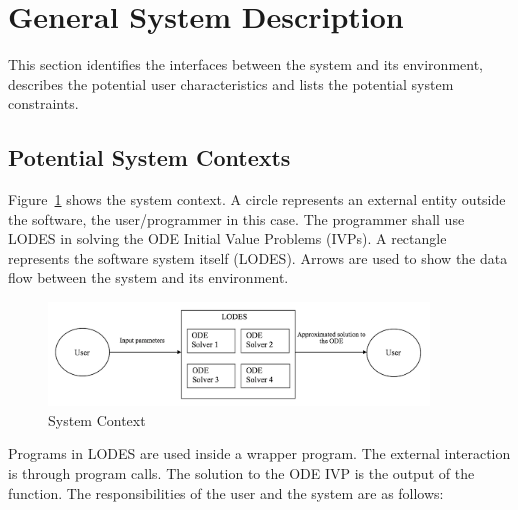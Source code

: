 \documentclass[12pt]{article}
\newcommand{\famname}{LODES} %
\begin{document}
\section{General System Description}

This section identifies the interfaces between the system and its environment,
describes the potential user characteristics and lists the potential system
constraints.

\subsection{Potential System Contexts}

Figure~\ref{Fig_SystemContext} shows the system context.  A circle represents an
external entity outside the software, the user/programmer in this case. The programmer
shall use \famname{} in solving the ODE Initial Value Problems (IVPs).
A rectangle represents the software system itself (\famname{}). 
Arrows are used to show the data flow between the system and its environment.

\begin{figure}[h!]
\begin{center}
 \includegraphics[width=0.9\textwidth, height=0.20\textheight]{SystemContextFigure}
\caption{System Context}
\label{Fig_SystemContext} 
\end{center}
\end{figure}

Programs in \famname{} are used inside a wrapper program.  The external interaction is through
program calls. The solution to the ODE IVP is the output of the function. 
The responsibilities of the user and the system are as follows:
\end{document}
